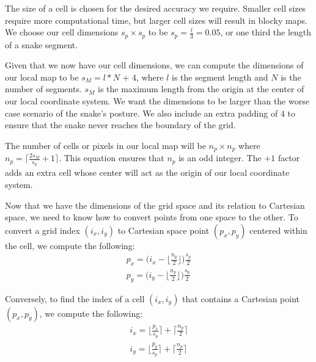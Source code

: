 The size of a cell is chosen for the desired accuracy we require.  Smaller cell sizes require more computational time, but larger cell sizes will result in blocky maps.  We choose our cell dimensions $s_p \times s_p$ to be
$s_p = \frac{l}{3} = 0.05$, or one third the length of a snake segment.

Given that we now have our cell dimensions, we can compute the dimensions of our local map to be 
$s_M = l * N$ + 4,
where $l$ is the segment length and $N$ is the number of segments.  $s_M$ is the maximum length from the origin at the center of our local coordinate system.  We want the dimensions to be larger than the worse case scenario of the snake's posture.  We also include an extra padding of $4$ to ensure that the snake never reaches the boundary of the grid.

The number of cells or pixels in our local map will be $n_p \times n_p$ where
$n_p = \bigg\lceil \frac{2 s_M}{s_p} + 1 \bigg\rceil$.  This equation ensures that $n_p$ is an odd integer.  The $+1$ factor adds an extra cell whose center will act as the origin of our local coordinate system.


Now that we have the dimensions of the grid space and its relation to Cartesian space, we need to know how to convert points from one space to the other.  To convert a grid index $(i_x,i_y)$ to Cartesian space point $(p_x,p_y)$ centered within the cell, we compute the following:
\begin{eqnarray}
\label{eqn:g_to_p}
p_x = \bigg(i_x - \bigg\lfloor\frac{n_p}{2}\bigg\rfloor \bigg)\frac{s_p}{2} \\
p_y = \bigg(i_y - \bigg\lfloor\frac{n_p}{2}\bigg\rfloor \bigg)\frac{s_p}{2}
\end{eqnarray}


Conversely, to find the index of a cell $(i_x,i_y)$ that contains a Cartesian point $(p_x,p_y)$, we compute the following:
\begin{eqnarray}
i_x = \bigg\lfloor \frac{p_x}{s_p} \bigg\rceil + \bigg\lceil\frac{n_p}{2}\bigg\rceil \\
i_y = \bigg\lfloor \frac{p_y}{s_p} \bigg\rceil + \bigg\lceil\frac{n_p}{2}\bigg\rceil
\end{eqnarray}


